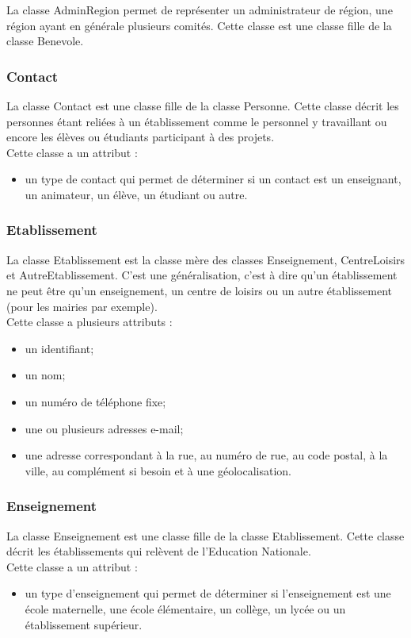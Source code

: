 La classe AdminRegion permet de représenter un administrateur de région, une région ayant en générale plusieurs comités. Cette classe est une classe fille de la classe Benevole. 

\subsubsection*{Contact}

La classe Contact est une classe fille de la classe Personne. Cette classe décrit les personnes étant reliées à un établissement comme le personnel y travaillant ou encore les élèves ou étudiants participant à des projets. \\
Cette classe a un attribut : 
\begin{itemize}
\item un type de contact qui permet de déterminer si un contact est un enseignant, un animateur, un élève, un étudiant ou autre.
\end{itemize} 

\subsubsection*{Etablissement}

La classe Etablissement est la classe mère des classes Enseignement, CentreLoisirs et AutreEtablissement. C'est une généralisation, c'est à dire qu'un établissement ne peut être qu'un enseignement, un centre de loisirs ou un autre établissement (pour les mairies par exemple).\\
Cette classe a plusieurs attributs : 
\begin{itemize}
\item un identifiant;
\item un nom;
\item un numéro de téléphone fixe;
\item une ou plusieurs adresses e-mail;
\item une adresse correspondant à la rue, au numéro de rue, au code postal, à la ville, au complément si besoin et à une géolocalisation.
\end{itemize}

\subsubsection*{Enseignement}
La classe Enseignement est une classe fille de la classe Etablissement. Cette classe décrit les établissements qui relèvent de l'Education Nationale. \\
Cette classe a un attribut : 
\begin{itemize}
\item un type d'enseignement qui permet de déterminer si l'enseignement est une école maternelle, une école élémentaire, un collège, un lycée ou un établissement supérieur. 
\end{itemize} 


